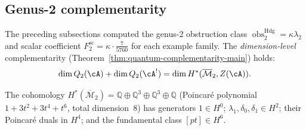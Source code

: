 \subsection{Genus-2 complementarity}\label{subsec:genus2-complementarity-verification}

The preceding subsections computed the genus-$2$ obstruction class
$\operatorname{obs}^{\mathrm{Hdg}}_2=\kappa\lambda_2$ and scalar coefficient
$F^{\mathrm{sc}}_2 = \kappa \cdot \frac{7}{5760}$ for each example family.
The \emph{dimension-level} complementarity
(Theorem~\ref{thm:quantum-complementarity-main}) holds:
\begin{equation}\label{eq:genus2-complementarity-dim}
\dim Q_2(\cA) + \dim Q_2(\cA^!) = \dim H^*(\overline{\mathcal{M}}_2,
Z(\cA)).
\end{equation}

The cohomology
$H^*(\overline{\mathcal{M}}_2) = \mathbb{Q} \oplus \mathbb{Q}^3
\oplus \mathbb{Q}^3 \oplus \mathbb{Q}$
(Poincar\'e polynomial $1 + 3t^2 + 3t^4 + t^6$, total dimension~$8$)
has generators $1 \in H^0$; $\lambda_1, \delta_0, \delta_1 \in H^2$;
their Poincar\'e duals in $H^4$; and the fundamental class $[pt] \in H^6$.

